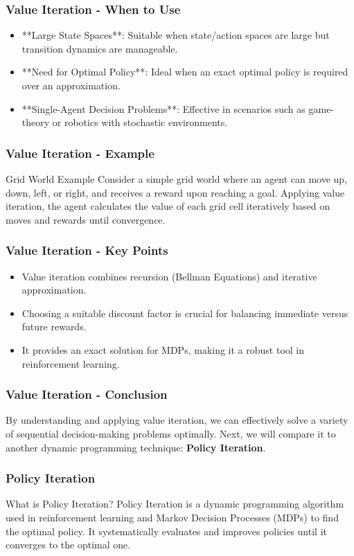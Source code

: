 \documentclass[aspectratio=169]{beamer}
\begin{document}
\begin{frame}[fragile]
    \frametitle{Value Iteration - When to Use}
    \begin{itemize}
        \item **Large State Spaces**: Suitable when state/action spaces are large but transition dynamics are manageable.
        \item **Need for Optimal Policy**: Ideal when an exact optimal policy is required over an approximation.
        \item **Single-Agent Decision Problems**: Effective in scenarios such as game-theory or robotics with stochastic environments.
    \end{itemize}
\end{frame}

\begin{frame}[fragile]
    \frametitle{Value Iteration - Example}
    \begin{block}{Grid World Example}
        Consider a simple grid world where an agent can move up, down, left, or right, and receives a reward upon reaching a goal. Applying value iteration, the agent calculates the value of each grid cell iteratively based on moves and rewards until convergence.
    \end{block}
\end{frame}

\begin{frame}[fragile]
    \frametitle{Value Iteration - Key Points}
    \begin{itemize}
        \item Value iteration combines recursion (Bellman Equations) and iterative approximation.
        \item Choosing a suitable discount factor is crucial for balancing immediate versus future rewards.
        \item It provides an exact solution for MDPs, making it a robust tool in reinforcement learning.
    \end{itemize}
\end{frame}

\begin{frame}[fragile]
    \frametitle{Value Iteration - Conclusion}
    By understanding and applying value iteration, we can effectively solve a variety of sequential decision-making problems optimally. 
    Next, we will compare it to another dynamic programming technique: \textbf{Policy Iteration}.
\end{frame}

\begin{frame}[fragile]
    \frametitle{Policy Iteration}
    \begin{block}{What is Policy Iteration?}
        Policy Iteration is a dynamic programming algorithm used in reinforcement learning and Markov Decision Processes (MDPs) to find the optimal policy. It systematically evaluates and improves policies until it converges to the optimal one.
    \end{block}
\end{frame}
\end{document}
